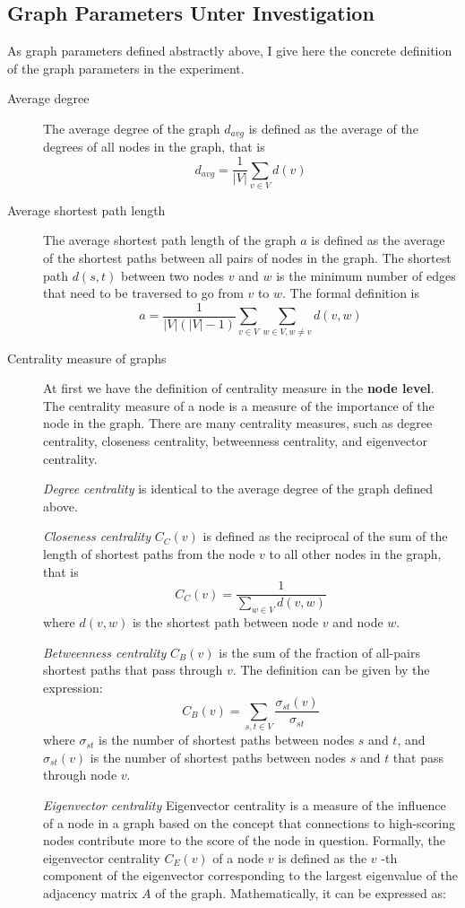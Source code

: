 \documentclass{article}
\begin{document}
\subsection{Graph Parameters Unter Investigation} \label{sec:graph_parameters}
As graph parameters defined abstractly above, I give here the concrete definition of the graph parameters in the experiment.\\
\begin{description}
    \item [Average degree] The average degree of the graph $d_{avg}$ is defined as the average of the degrees of all nodes in the graph, that is
    $$ d_{avg} = \frac{1}{|V|} \sum_{v \in V} d(v)$$
    \item [Average shortest path length] The average shortest path length of the graph $a$ is defined as the average of the shortest paths between all pairs of nodes in the graph. The shortest path $d(s, t)$ between two nodes $v$ and $w$ is the minimum number of edges that need to be traversed to go from $v$ to $w$. The formal definition is
    $$
a = \frac{1}{|V|(|V|-1)} \sum_{v \in V} \sum_{w \in V, w \neq v} d(v, w)
    $$
    \item [Centrality measure of graphs] At first we have the definition of centrality measure in the \textbf{node level}. The centrality measure of a node is a measure of the importance of the node in the graph. There are many centrality measures, such as degree centrality, closeness centrality, betweenness centrality, and eigenvector centrality. 
    
    \textit{Degree centrality} is identical to the average degree of the graph defined above. 
    
    \textit{Closeness centrality} $C_C(v)$ is defined as the reciprocal of the sum of the length of shortest paths from the node $v$ to all other nodes in the graph, that is 
    $$C_C(v) = \frac{1}{\sum_{w\in V}{d(v ,w)}}$$
    where $d(v, w)$ is the shortest path between node $v$ and node $w$. 
    
    \textit{Betweenness centrality} $C_B(v)$ is the sum of the fraction of all-pairs shortest paths that pass through $v$. The definition can be given by the expression:
    $$
        C_B(v) = \sum_{s,t \in V} \frac{\sigma_{st}(v)}{\sigma_{st}}
    $$
    where $\sigma_{st}$ is the number of shortest paths between nodes $s$ and $t$, and $\sigma_{st}(v)$ is the number of shortest paths between nodes $s$ and $t$ that pass through node $v$.
    
    \textit{Eigenvector centrality} Eigenvector centrality is a measure of the influence of a node in a graph based on the concept that connections to high-scoring nodes contribute more to the score of the node in question. Formally, the eigenvector centrality $C_E(v)$ of a node $v$  is defined as the $v$ -th component of the eigenvector corresponding to the largest eigenvalue of the adjacency matrix $A$ of the graph. Mathematically, it can be expressed as:
    

\end{description}
\end{document}
